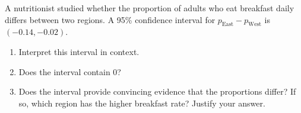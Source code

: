 \documentclass[10pt]{article}
\begin{document}
\namedateperiod

\vspace{0.15in}

A nutritionist studied whether the proportion of adults who eat breakfast daily differs between
two regions. A 95\% confidence interval for $p_{\text{East}} - p_{\text{West}}$ is
$(-0.14, -0.02)$.

\begin{enumerate}
  \item Interpret this interval in context. 

  \item Does the interval contain 0? \blank{1.5cm}

  \item Does the interval provide convincing evidence that the proportions differ?
        If so, which region has the higher breakfast rate? Justify your answer.
\end{enumerate}
\end{document}

